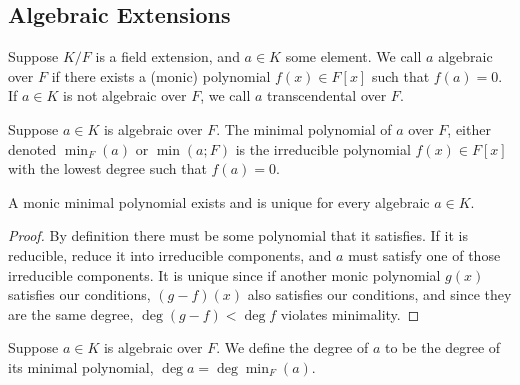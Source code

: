 \subsection{Algebraic Extensions}

\begin{definition}
    Suppose \(K/F\) is a field extension, and \(a \in K\) some element.
    We call \(a\) algebraic over \(F\)
    if there exists a (monic) polynomial \(f(x) \in F[x]\) such that \(f(a) = 0\).
    If \(a \in K\) is not algebraic over \(F\),
    we call \(a\) transcendental over \(F\).
\end{definition}

\begin{definition}
    Suppose \(a \in K\) is algebraic over \(F\).
    The minimal polynomial of \(a\) over \(F\),
    either denoted \(\min_F(a)\) or \(\min(a;F)\)
    is the irreducible polynomial \(f(x) \in F[x]\)
    with the lowest degree such that \(f(a) = 0\).
\end{definition}
\begin{proposition}
    A monic minimal polynomial exists and is unique for every algebraic \(a \in K\).
\end{proposition}
\begin{proof}
    By definition there must be some polynomial that it satisfies.
    If it is reducible, reduce it into irreducible components,
    and \(a\) must satisfy one of those irreducible components.
    It is unique since if another monic polynomial \(g(x)\) satisfies our conditions,
    \((g-f)(x)\) also satisfies our conditions,
    and since they are the same degree, \(\deg(g-f) < \deg f\) violates minimality.
\end{proof}
\begin{definition}
    Suppose \(a \in K\) is algebraic over \(F\).
    We define the degree of \(a\) to be the degree of its minimal polynomial,
    \(\deg a = \deg \min_F(a)\).
\end{definition}

